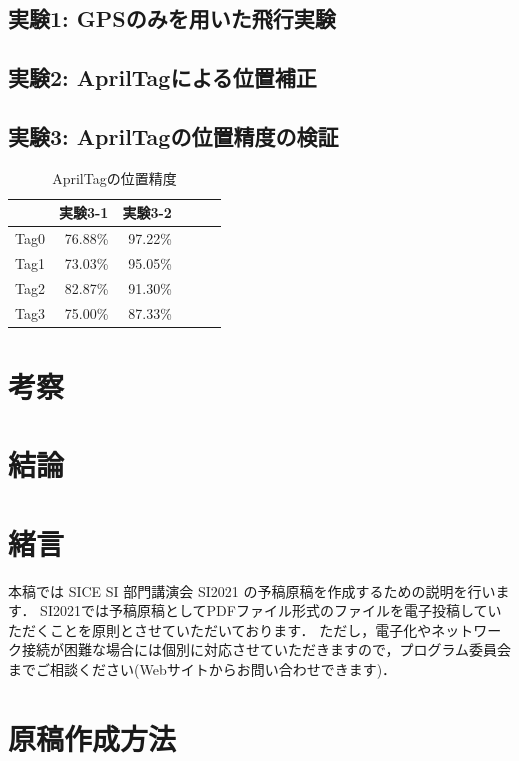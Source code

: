 \documentclass[a4j,fleqn,dvipdfmx,uplatex]{jsarticle}
\begin{document}
\subsection{実験1: GPSのみを用いた飛行実験}\label{subsec:ex1}

\subsection{実験2: AprilTagによる位置補正}\label{subsec:ex2}

\subsection{実験3: AprilTagの位置精度の検証}\label{subsec:ex3}

\begin{table}[h]
\caption{AprilTagの位置精度}
\label{table:tag_pos}
\centering
\begin{tabular}{lrrrrr}
    & 実験3-1 & 実験3-2 \\
    \hline \hline
    Tag0 & 76.88\% & 97.22\% \\
    Tag1 & 73.03\% & 95.05\% \\
    Tag2 & 82.87\% & 91.30\% \\
    Tag3 & 75.00\% & 87.33\% \\
    \hline
\end{tabular}
\end{table}


\section{考察}


\section{結論}

\section{緒言}
本稿では SICE SI 部門講演会 SI2021 の予稿原稿を作成するための説明を行います．
SI2021では予稿原稿としてPDFファイル形式のファイルを電子投稿していただくことを原則とさせていただいております．
ただし，電子化やネットワーク接続が困難な場合には個別に対応させていただきますので，プログラム委員会までご相談ください(Webサイトからお問い合わせできます)．
%
\section{原稿作成方法}
\end{document}
